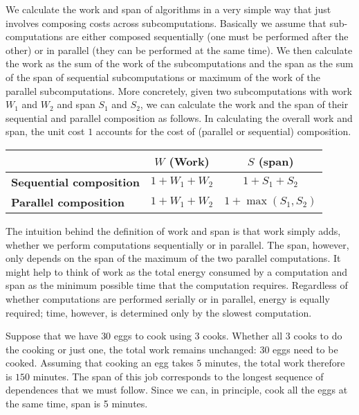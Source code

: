 \begin{grp}
\begin{definition}
We calculate the work and span of algorithms in a very
simple way that just involves composing costs across subcomputations.
%
Basically we assume that sub-computations are either composed
sequentially (one must be performed after the other) or in parallel
(they can be performed at the same time).
%
We then calculate the work as the sum of the work of the
subcomputations and the span as the sum of the span of sequential
subcomputations or maximum of the work of the parallel
subcomputations.
%
More concretely, given two subcomputations with work $W_1$ and $W_2$
and span $S_1$ and $S_2$, we can calculate the work and the span of
their sequential and parallel composition as follows.
%
In calculating the overall work and span, the unit cost $1$ accounts
for the cost of (parallel or sequential) composition.


\begin{center}
\renewcommand{\arraystretch}{1.5}
\begin{tabular}{lcc}
\toprule
                          &  \bf $W$ (Work) & \bf $S$ (span)\\
\midrule
\bf Sequential composition & $1 + W_1 + W_2$ & $1 + S_1+ S_2$\\
\midrule
\bf Parallel composition   & $1 + W_1 + W_2$ & $1 + \max(S_1, S_2)$\\
\bottomrule
\end{tabular}
\end{center}
\end{definition}

\begin{note}
The intuition behind the definition of work and span is that work
simply adds, whether we perform computations sequentially or in
parallel.  The span, however, only depends on the span of the maximum
of the two parallel computations.  It might help to think of work as
the total energy consumed by a computation and span as the minimum
possible time that the computation requires.  Regardless of whether
computations are performed serially or in parallel, energy is equally
required; time, however, is determined only by the slowest
computation.
\end{note}


\begin{example}
Suppose that we have $30$ eggs to cook using $3$ cooks.  Whether all
$3$ cooks to do the cooking or just one, the total work remains
unchanged: $30$ eggs need to be cooked.
%
Assuming that cooking an egg takes $5$ minutes, the total work
therefore is $150$ minutes.
%
The span of this job corresponds to the longest sequence of
dependences that we must follow.
%
Since we can, in principle, cook all the eggs at the same time, 
span is 5 minutes.
%


\end{example}
\end{grp}
